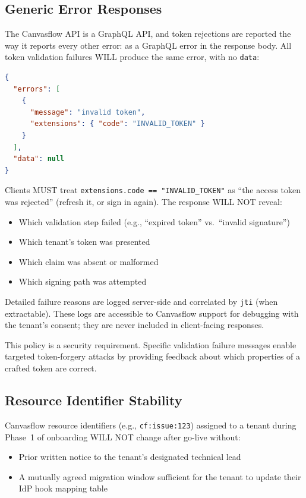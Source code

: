 \subsection{Generic Error Responses}\label{sec:generic-error-responses}

The Canvasflow API is a GraphQL API, and token rejections are reported the way it
reports every other error: as a GraphQL error in the response body. All token
validation failures WILL produce the same error, with no \texttt{data}:

\begin{lstlisting}[language=json]
{
  "errors": [
    {
      "message": "invalid token",
      "extensions": { "code": "INVALID_TOKEN" }
    }
  ],
  "data": null
}
\end{lstlisting}

Clients MUST treat \texttt{extensions.code == "INVALID\_TOKEN"} as ``the access token
was rejected'' (refresh it, or sign in again). The response WILL NOT reveal:
\begin{itemize}
  \item Which validation step failed (e.g., ``expired token'' vs.\ ``invalid signature'')
  \item Which tenant's token was presented
  \item Which claim was absent or malformed
  \item Which signing path was attempted
\end{itemize}

Detailed failure reasons are logged server-side and correlated by \texttt{jti} (when
extractable). These logs are accessible to Canvasflow support for debugging with the
tenant's consent; they are never included in client-facing responses.

This policy is a security requirement. Specific validation failure messages enable
targeted token-forgery attacks by providing feedback about which properties of a crafted
token are correct.

\subsection{Resource Identifier Stability}

Canvasflow resource identifiers (e.g., \texttt{cf:issue:123}) assigned to a tenant
during Phase~1 of onboarding WILL NOT change after go-live without:

\begin{itemize}
  \item Prior written notice to the tenant's designated technical lead
  \item A mutually agreed migration window sufficient for the tenant to update their IdP
    hook mapping table
\end{itemize}

